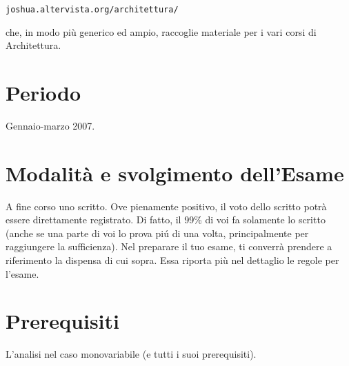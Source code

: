 \documentclass{article}
\begin{document}
         {\tt joshua.altervista.org/architettura/}

che, in modo pi\`u generico ed ampio, raccoglie materiale
per i vari corsi di Architettura.


\section*{Periodo}

Gennaio-marzo 2007.


\section*{Modalit\`a e svolgimento dell'Esame}

A fine corso uno scritto.
Ove pienamente positivo,
il voto dello scritto potr\`a essere direttamente registrato.
Di fatto, il 99\% di voi fa solamente lo scritto
(anche se una parte di voi lo prova pi\'u di una volta,
principalmente per raggiungere la sufficienza).
Nel preparare il tuo esame,
ti converr\`a prendere a riferimento la dispensa di cui sopra.
Essa riporta pi\`u nel dettaglio le regole per l'esame.

\section*{Prerequisiti}

    L'analisi nel caso monovariabile (e tutti i suoi prerequisiti).
\end{document}
